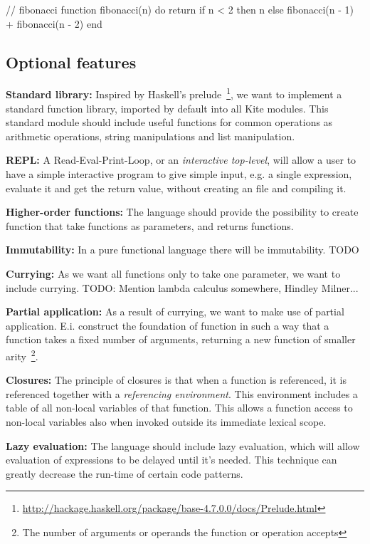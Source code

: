 \begin{pseudo}
// fibonacci
function fibonacci(n) do
  return if n < 2
    then n
    else fibonacci(n - 1) + fibonacci(n - 2)
end
\end{pseudo}


\subsection{Optional features}

\textbf{Standard library:}
Inspired by Haskell's prelude~\footnote{\url{http://hackage.haskell.org/package/base-4.7.0.0/docs/Prelude.html}}, we want to implement a standard function library, imported by default into all Kite modules. This standard module should include useful functions for common operations as arithmetic operations, string manipulations and list manipulation.

\textbf{REPL:}
A Read-Eval-Print-Loop, or an \emph{interactive top-level}, will allow a user to have a simple interactive program to give simple input, e.g. a single expression, evaluate it and get the return value, without creating an file and compiling it.

\textbf{Higher-order functions:}
The language should provide the possibility to create function that take functions as parameters, and returns functions.

\textbf{Immutability:}
In a pure functional language there will be immutability.
TODO


\textbf{Currying:}
As we want all functions only to take one parameter, we want to include currying.
TODO: Mention lambda calculus somewhere, Hindley Milner...

\textbf{Partial application:}
As a result of currying, we want to make use of partial application. E.i. construct the foundation of function in such a way that a function takes a fixed number of arguments, returning a new function of smaller arity~\footnote{The number of arguments or operands the function or operation accepts}.

\textbf{Closures:}
The principle of closures is that when a function is referenced, it is referenced together with a \emph{referencing environment}. This environment includes a table of all non-local variables of that function. This allows a function access to non-local  variables also when invoked outside its immediate lexical scope.

\textbf{Lazy evaluation:}
The language should include lazy evaluation, which will allow evaluation of expressions to be delayed until it's needed. This technique can greatly decrease the run-time of certain code patterns.

